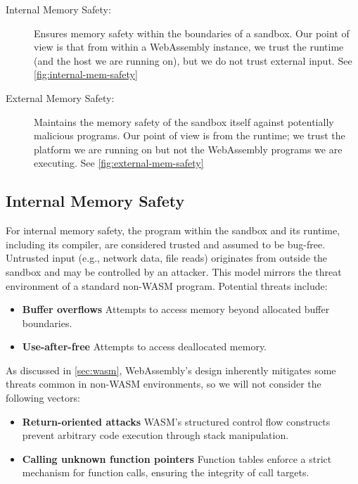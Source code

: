 \begin{description}
    \item[Internal Memory Safety:] Ensures memory safety within the boundaries of a sandbox.
    Our point of view is that from within a WebAssembly instance, we trust the runtime (and the host we are running on), but we do not trust external input.
    See \cref{fig:internal-mem-safety}
    \item[External Memory Safety:] Maintains the memory safety of the sandbox itself against potentially malicious programs.
    Our point of view is from the runtime; we trust the platform we are running on but not the WebAssembly programs we are executing.
    See \cref{fig:external-mem-safety}
\end{description}

\subsection{Internal Memory Safety}
\label{subsec:internal-memory-safety}
For internal memory safety, the program within the sandbox and its runtime, including its compiler, are considered trusted and assumed to be bug-free.
Untrusted input (e.g., network data, file reads) originates from outside the sandbox and may be controlled by an attacker.
This model mirrors the threat environment of a standard non-\ac{WASM} program.
Potential threats include:

\begin{itemize}
    \item \textbf{Buffer overflows} Attempts to access memory beyond allocated buffer boundaries.
    \item \textbf{Use-after-free} Attempts to access deallocated memory.
\end{itemize}

As discussed in \cref{sec:wasm}, WebAssembly's design inherently mitigates some threats common in non-\ac{WASM} environments, so we will not consider the following vectors:

\begin{itemize}
    \item \textbf{Return-oriented attacks} {\ac{WASM}'s} structured control flow constructs prevent arbitrary code execution through stack manipulation.
    \item \textbf{Calling unknown function pointers} Function tables enforce a strict mechanism for function calls, ensuring the integrity of call targets.
\end{itemize}


